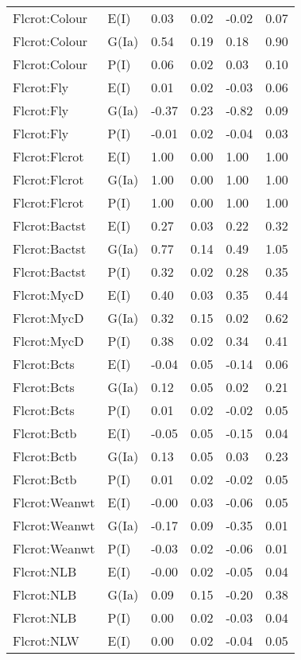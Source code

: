 \begin{center}
\begin{longtable}{|p{1.1in}|p{0.7in}|p{0.7in}|p{0.6in}|p{0.6in}|p{0.6in}|}
  Flcrot:Colour & E(I) & 0.03 & 0.02 & -0.02 & 0.07 \\ 
  Flcrot:Colour & G(Ia) & 0.54 & 0.19 & 0.18 & 0.90 \\ 
  Flcrot:Colour & P(I) & 0.06 & 0.02 & 0.03 & 0.10 \\ 
  Flcrot:Fly & E(I) & 0.01 & 0.02 & -0.03 & 0.06 \\ 
  Flcrot:Fly & G(Ia) & -0.37 & 0.23 & -0.82 & 0.09 \\ 
  Flcrot:Fly & P(I) & -0.01 & 0.02 & -0.04 & 0.03 \\ 
  Flcrot:Flcrot & E(I) & 1.00 & 0.00 & 1.00 & 1.00 \\ 
  Flcrot:Flcrot & G(Ia) & 1.00 & 0.00 & 1.00 & 1.00 \\ 
  Flcrot:Flcrot & P(I) & 1.00 & 0.00 & 1.00 & 1.00 \\ 
  Flcrot:Bactst & E(I) & 0.27 & 0.03 & 0.22 & 0.32 \\ 
  Flcrot:Bactst & G(Ia) & 0.77 & 0.14 & 0.49 & 1.05 \\ 
  Flcrot:Bactst & P(I) & 0.32 & 0.02 & 0.28 & 0.35 \\ 
  Flcrot:MycD & E(I) & 0.40 & 0.03 & 0.35 & 0.44 \\ 
  Flcrot:MycD & G(Ia) & 0.32 & 0.15 & 0.02 & 0.62 \\ 
  Flcrot:MycD & P(I) & 0.38 & 0.02 & 0.34 & 0.41 \\ 
  Flcrot:Bcts & E(I) & -0.04 & 0.05 & -0.14 & 0.06 \\ 
  Flcrot:Bcts & G(Ia) & 0.12 & 0.05 & 0.02 & 0.21 \\ 
  Flcrot:Bcts & P(I) & 0.01 & 0.02 & -0.02 & 0.05 \\ 
  Flcrot:Bctb & E(I) & -0.05 & 0.05 & -0.15 & 0.04 \\ 
  Flcrot:Bctb & G(Ia) & 0.13 & 0.05 & 0.03 & 0.23 \\ 
  Flcrot:Bctb & P(I) & 0.01 & 0.02 & -0.02 & 0.05 \\ 
  Flcrot:Weanwt & E(I) & -0.00 & 0.03 & -0.06 & 0.05 \\ 
  Flcrot:Weanwt & G(Ia) & -0.17 & 0.09 & -0.35 & 0.01 \\ 
  Flcrot:Weanwt & P(I) & -0.03 & 0.02 & -0.06 & 0.01 \\ 
  Flcrot:NLB & E(I) & -0.00 & 0.02 & -0.05 & 0.04 \\ 
  Flcrot:NLB & G(Ia) & 0.09 & 0.15 & -0.20 & 0.38 \\ 
  Flcrot:NLB & P(I) & 0.00 & 0.02 & -0.03 & 0.04 \\ 
  Flcrot:NLW & E(I) & 0.00 & 0.02 & -0.04 & 0.05 \\ 

\end{longtable}
\end{center}

